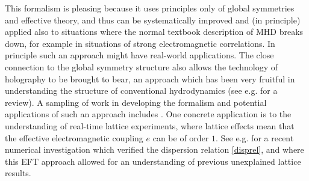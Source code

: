 \documentclass[aps,preprint,nofootinbib,preprintnumbers,eqsecnum,superscriptaddress]{revtex4}
\numberwithin{equation}{section}
\begin{document}
This formalism is pleasing because it uses principles only of global symmetries and effective theory, and thus can be systematically improved and (in principle) applied also to situations where the normal textbook description of MHD breaks down, for example in situations of strong electromagnetic correlations. In principle such an approach might have real-world applications. The close connection to the global symmetry structure also allows the technology of holography to be brought to bear, an approach which has been very fruitful in understanding the structure of conventional hydrodynamics (see e.g. \cite{Son:2007vk} for a review). A sampling of work in developing the formalism and potential applications of such an approach includes \cite{Armas:2023tyx,Das:2022fho,Davison:2022vqh,Vardhan:2022wxz,Armas:2022wvb,Poovuttikul:2021fdi,Armas:2019sbe,Gralla:2018kif,Glorioso:2018kcp,Grozdanov:2018fic,Grozdanov:2018ewh,Grozdanov:2017kyl}. One concrete application is to the understanding of real-time lattice experiments, where lattice effects mean that the effective electromagnetic coupling $e$ can be of order $1$. See e.g. \cite{Das:2023nwl} for a recent numerical investigation which verified the dispersion relation \eqref{disprel}, and where this EFT approach allowed for an understanding of previous unexplained lattice results. 
\end{document}
